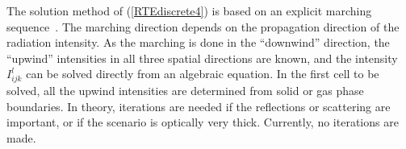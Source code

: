 The solution method of (\ref{RTEdiscrete4}) is based on an explicit marching sequence~\cite{Kim}. The marching direction depends on the
propagation direction of the radiation intensity. As the marching is done in the ``downwind'' direction, the ``upwind'' intensities in all
three spatial directions are known, and the intensity $I_{ijk}^l$ can be solved directly from an algebraic equation. In the first cell to be solved,
all the upwind intensities are determined from solid or gas phase boundaries. In theory, iterations are needed if the reflections
or scattering are important, or if the scenario is optically very thick. Currently, no iterations are made.



